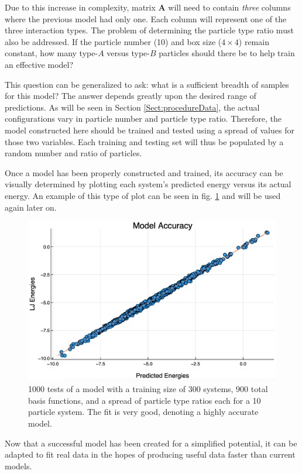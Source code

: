 \par Due to this increase in complexity, matrix $\mathbf{A}$ will need to contain \textit{three} columns where the previous model had only one. Each column will represent one of the three interaction types. The problem of determining the particle type ratio must also be addressed. If the particle number (10) and box size ($4\times4$) remain constant, how many type-$A$ versus type-$B$ particles should there be to help train an effective model?
\par This question can be generalized to ask: what is a sufficient breadth of samples for this model? The answer depends greatly upon the desired range of predictions. As will be seen in Section \ref{Sect:procedureData}, the actual configurations vary in particle number and particle type ratio. Therefore, the model constructed here should be trained and tested using a spread of values for those two variables. Each training and testing set will thus be populated by a random number and ratio of particles. 
\par Once a model has been properly constructed and trained, its accuracy can be visually determined by plotting each system's predicted energy versus its actual energy. An example of this type of plot can be seen in fig. \ref{fig:diatomicAccuracy} and will be used again later on.

\begin{figure}%
\centering
\includegraphics[scale = 0.4]{Figures/diatomicAccuracy}
\caption{1000 tests of a model with a training size of 300 systems, 900 total basis functions, and a spread of particle type ratios each for a 10 particle system. The fit is very good, denoting a highly accurate model.
\label{fig:diatomicAccuracy}}
\end{figure}

\par Now that a successful model has been created for a simplified potential, it can be adapted to fit real data in the hopes of producing useful data faster than current models.